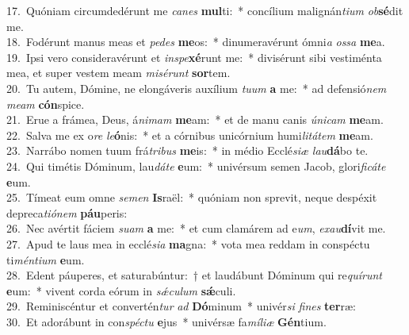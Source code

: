 {17.~}Quóniam circumdedérunt me \textit{ca}\textit{nes} \textbf{mul}ti:~* concílium malignán\textit{ti}\textit{um} \textit{ob}\textbf{sé}dit me.\\
{18.~}Fodérunt manus meas et \textit{pe}\textit{des} \textbf{me}os:~* dinumeravérunt ómni\textit{a} \textit{os}\textit{sa} \textbf{me}a.\\
{19.~}Ipsi vero consideravérunt et \textit{in}\textit{spe}\textbf{xé}runt me:~* divisérunt sibi vestiménta mea, et super vestem meam \textit{mi}\textit{sé}\textit{runt} \textbf{sor}tem.\\
{20.~}Tu autem, Dómine, ne elongáveris auxílium \textit{tu}\textit{um} \textbf{a} me:~* ad defensió\textit{nem} \textit{me}\textit{am} \textbf{cón}spice.\\
{21.~}Erue a frámea, Deus, á\textit{ni}\textit{mam} \textbf{me}am:~* et de manu canis \textit{ú}\textit{ni}\textit{cam} \textbf{me}am.\\
{22.~}Salva me ex o\textit{re} \textit{le}\textbf{ó}nis:~* et a córnibus unicórnium humi\textit{li}\textit{tá}\textit{tem} \textbf{me}am.\\
{23.~}Narrábo nomen tuum frá\textit{tri}\textit{bus} \textbf{me}is:~* in médio Ecclé\textit{si}\textit{æ} \textit{lau}\textbf{dá}bo te.\\
{24.~}Qui timétis Dóminum, lau\textit{dá}\textit{te} \textbf{e}um:~* univérsum semen Jacob, glori\textit{fi}\textit{cá}\textit{te} \textbf{e}um.\\
{25.~}Tímeat eum omne \textit{se}\textit{men} \textbf{Is}raël:~* quóniam non sprevit, neque despéxit depreca\textit{ti}\textit{ó}\textit{nem} \textbf{páu}peris:\\
{26.~}Nec avértit fáciem \textit{su}\textit{am} \textbf{a} me:~* et cum clamárem ad e\textit{um}, \textit{e}\textit{xau}\textbf{dí}vit me.\\
{27.~}Apud te laus mea in ecclé\textit{si}\textit{a} \textbf{ma}gna:~* vota mea reddam in conspéctu ti\textit{mén}\textit{ti}\textit{um} \textbf{e}um.\\
{28.~}Edent páuperes, et saturabúntur:~† et laudábunt Dóminum qui re\textit{quí}\textit{runt} \textbf{e}um:~* vivent corda eórum in \textit{sǽ}\textit{cu}\textit{lum} \textbf{sǽ}culi.\\
{29.~}Reminiscéntur et convertén\textit{tur} \textit{ad} \textbf{Dó}minum~* univér\textit{si} \textit{fi}\textit{nes} \textbf{ter}ræ:\\
{30.~}Et adorábunt in con\textit{spé}\textit{ctu} \textbf{e}jus~* univérsæ fa\textit{mí}\textit{li}\textit{æ} \textbf{Gén}tium.\\

